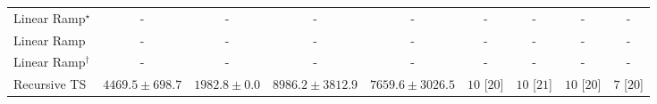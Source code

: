\begin{tabular}{l|cccc|cccc|}
Linear Ramp$^\star$ & {\cellcolor[HTML]{000000}} \color[HTML]{F1F1F1} {\cellcolor{white}} \color{black} - & {\cellcolor[HTML]{000000}} \color[HTML]{F1F1F1} {\cellcolor{white}} \color{black} - & {\cellcolor[HTML]{000000}} \color[HTML]{F1F1F1} {\cellcolor{white}} \color{black} - & {\cellcolor[HTML]{000000}} \color[HTML]{F1F1F1} {\cellcolor{white}} \color{black} - & {\cellcolor[HTML]{000000}} \color[HTML]{F1F1F1} {\cellcolor{white}} \color{black} - & {\cellcolor[HTML]{000000}} \color[HTML]{F1F1F1} {\cellcolor{white}} \color{black} - & {\cellcolor[HTML]{000000}} \color[HTML]{F1F1F1} {\cellcolor{white}} \color{black} - & {\cellcolor[HTML]{000000}} \color[HTML]{F1F1F1} {\cellcolor{white}} \color{black} - \\
Linear Ramp & {\cellcolor[HTML]{000000}} \color[HTML]{F1F1F1} {\cellcolor{white}} \color{black} - & {\cellcolor[HTML]{000000}} \color[HTML]{F1F1F1} {\cellcolor{white}} \color{black} - & {\cellcolor[HTML]{000000}} \color[HTML]{F1F1F1} {\cellcolor{white}} \color{black} - & {\cellcolor[HTML]{000000}} \color[HTML]{F1F1F1} {\cellcolor{white}} \color{black} - & {\cellcolor[HTML]{000000}} \color[HTML]{F1F1F1} {\cellcolor{white}} \color{black} - & {\cellcolor[HTML]{000000}} \color[HTML]{F1F1F1} {\cellcolor{white}} \color{black} - & {\cellcolor[HTML]{000000}} \color[HTML]{F1F1F1} {\cellcolor{white}} \color{black} - & {\cellcolor[HTML]{000000}} \color[HTML]{F1F1F1} {\cellcolor{white}} \color{black} - \\
Linear Ramp$^\dagger$ & {\cellcolor[HTML]{000000}} \color[HTML]{F1F1F1} {\cellcolor{white}} \color{black} - & {\cellcolor[HTML]{000000}} \color[HTML]{F1F1F1} {\cellcolor{white}} \color{black} - & {\cellcolor[HTML]{000000}} \color[HTML]{F1F1F1} {\cellcolor{white}} \color{black} - & {\cellcolor[HTML]{000000}} \color[HTML]{F1F1F1} {\cellcolor{white}} \color{black} - & {\cellcolor[HTML]{000000}} \color[HTML]{F1F1F1} {\cellcolor{white}} \color{black} - & {\cellcolor[HTML]{000000}} \color[HTML]{F1F1F1} {\cellcolor{white}} \color{black} - & {\cellcolor[HTML]{000000}} \color[HTML]{F1F1F1} {\cellcolor{white}} \color{black} - & {\cellcolor[HTML]{000000}} \color[HTML]{F1F1F1} {\cellcolor{white}} \color{black} - \\
Recursive TS & {\cellcolor[HTML]{9AB8D8}} \color[HTML]{000000} $4469.5\pm 698.7$ & {\cellcolor[HTML]{F2ECF5}} \color[HTML]{000000} $1982.8\pm 0.0$ & {\cellcolor[HTML]{023D60}} \color[HTML]{F1F1F1} $8986.2\pm 3812.9$ & {\cellcolor[HTML]{05659F}} \color[HTML]{F1F1F1} $7659.6\pm 3026.5$ & {\cellcolor[HTML]{49006A}} \color[HTML]{F1F1F1} $10$ [$20$] & {\cellcolor[HTML]{49006A}} \color[HTML]{F1F1F1} $10$ [$21$] & {\cellcolor[HTML]{49006A}} \color[HTML]{F1F1F1} $10$ [$20$] & {\cellcolor[HTML]{CD238F}} \color[HTML]{F1F1F1} $7$ [$20$] \\

\end{tabular}

